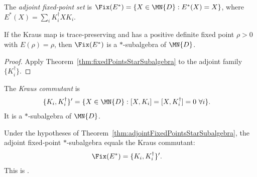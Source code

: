 \begin{definition}\label{def:adjoint_fixed_points}
    \leanok
    The \emph{adjoint fixed-point set} is
    $\Fix(E^*)=\{X\in\MN{D}:E^*(X)=X\}$, where
    $E^*(X)=\sum_iK_i^\dagger XK_i$.
\end{definition}

\begin{theorem}
    \label{thm:adjointFixedPointsStarSubalgebra}
    \leanok
    If the Kraus map is trace-preserving and has a positive definite
    fixed point $\rho>0$ with $E(\rho)=\rho$, then $\Fix(E^*)$ is a
    $*$-subalgebra of $\MN{D}$.
\end{theorem}

\begin{proof}\leanok
    Apply Theorem~\ref{thm:fixedPointsStarSubalgebra} to the adjoint
    family $\{K_i^\dagger\}$.
\end{proof}

\begin{definition}\label{def:kraus_commutant}
    \leanok
    The \emph{Kraus commutant} is
    \begin{align}
        \{K_i,K_i^\dagger\}'
         & =\{X\in\MN{D}:[X,K_i]=[X,K_i^\dagger]=0\ \forall i\}.
        \label{eq:channel_kraus_commutant}
    \end{align}
    It is a $*$-subalgebra of $\MN{D}$.
\end{definition}

\begin{theorem}
    \label{thm:adjointFixedPoints_eq_krausCommutant}
    \leanok
    Under the hypotheses of Theorem~\ref{thm:adjointFixedPointsStarSubalgebra},
    the adjoint fixed-point $*$-subalgebra equals the Kraus commutant:
    \begin{align}
        \Fix(E^*)
         & =\{K_i,K_i^\dagger\}'.
        \label{eq:channel_adjoint_fix_commutant}
    \end{align}
    This is \cite[Theorem~6.13]{Wolf2012Quantum}.
\end{theorem}

